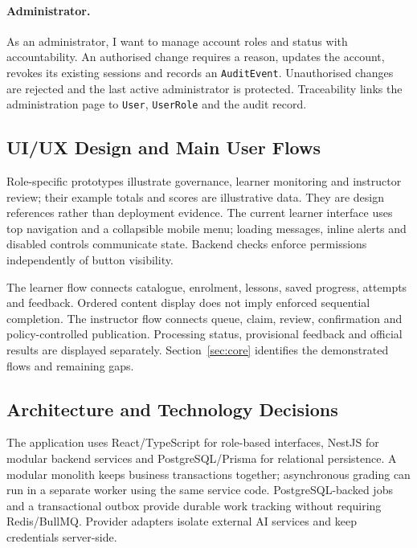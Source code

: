 \paragraph{Administrator.}
As an administrator, I want to manage account roles and status with
accountability. An authorised change requires a reason, updates the account,
revokes its existing sessions and records an \texttt{AuditEvent}.
Unauthorised changes are rejected and the last active administrator is
protected. Traceability links the administration page to \texttt{User},
\texttt{UserRole} and the audit record.

\subsection{UI/UX Design and Main User Flows}
Role-specific prototypes illustrate governance, learner monitoring and
instructor review; their example totals and scores are illustrative data.
They are design references rather than deployment evidence. The current
learner interface uses top navigation and a collapsible mobile menu;
loading messages, inline alerts and disabled controls communicate state.
Backend checks enforce permissions independently of button visibility.

The learner flow connects catalogue, enrolment, lessons, saved progress,
attempts and feedback. Ordered content display does not imply enforced
sequential completion. The instructor flow connects queue, claim, review,
confirmation and policy-controlled publication. Processing status,
provisional feedback and official results are displayed separately.
Section~\ref{sec:core} identifies the demonstrated flows and remaining gaps.

\subsection{Architecture and Technology Decisions}
The application uses React/TypeScript for role-based interfaces, NestJS for
modular backend services and PostgreSQL/Prisma for relational persistence.
A modular monolith keeps business transactions together; asynchronous
grading can run in a separate worker using the same service code.
PostgreSQL-backed jobs and a transactional outbox provide durable work
tracking without requiring Redis/BullMQ. Provider adapters isolate external
AI services and keep credentials server-side.

